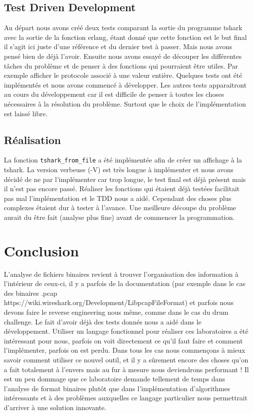 \documentclass[10pt,a4paper]{article}
\begin{document}
\subsection{Test Driven Development}
Au départ nous avons créé deux tests comparant la sortie du programme tshark avec la sortie de la fonction erlang, étant donné que cette fonction est le but final il s'agit ici juste d'une référence et du dernier test à passer. Mais nous avons pensé bien de déjà l'avoir. Ensuite nous avons essayé de découper les différentes tâches du problème et de penser à des fonctions qui pourraient être utiles. Par exemple afficher le protocole associé à une valeur entière. Quelques tests ont été implémentés et nous avons commencé à développer. Les autres tests apparaitront au cours du développement car il est difficile de penser à toutes les choses nécessaires à la résolution du problème. Surtout que le choix de l'implémentation est laissé libre.

\subsection{Réalisation}
La fonction \texttt{tshark\_from\_file} a été implémentée afin de créer un affichage à la tshark. La version verbeuse (-V) est très longue à implémenter et nous avons décidé de ne par l'implémenter car trop longue, le test final est déjà présent mais il n'est pas encore passé. Réaliser les fonctions qui étaient déjà testées facilitait pas mal l'implémentation et le TDD nous a aidé. Cependant des choses plus complexes étaient dur à tester à l'avance. Une meilleure découpe du problème aurait du être fait (analyse plus fine) avant de commencer la programmation.

\section{Conclusion}
L'analyse de fichiers binaires revient à trouver l'organisation des information à l'intérieur de ceux-ci, il y a parfois de la documentation (par exemple dans le cas des binaires .pcap \\https://wiki.wireshark.org/Development/LibpcapFileFormat) 	et parfois nous devons faire le reverse engineering nous même, comme dans le cas du drum challenge.
Le fait d'avoir déjà des tests donnés nous a aidé dans le développement. Utiliser un langage fonctionnel pour réaliser ces laboratoires a été intéressant pour nous, parfois on voit directement ce qu'il faut faire et comment l'implémenter, parfois on est perdu. Dans tous les cas nous commençons à mieux savoir comment utiliser ce nouvel outil, et il y a sûrement encore des choses qu'on a fait totalement à l'envers mais au fur à mesure nous deviendrons performant ! Il est un peu dommage que ce laboratoire demande tellement de temps dans l'analyse de format binaires plutôt que dans l'implémentation d'algorithmes intéressants et à des problèmes auxquelles ce langage particulier nous permettrait d'arriver à une solution innovante.
\end{document}
